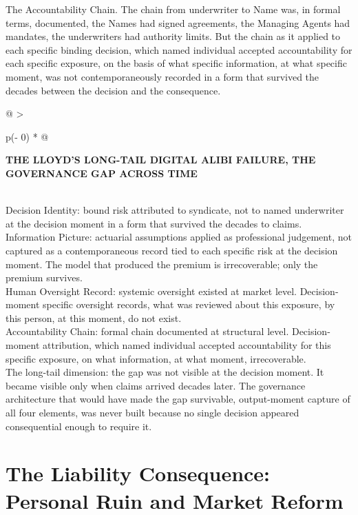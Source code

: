 The Accountability Chain. The chain from underwriter to Name was, in formal terms, documented, the Names had signed agreements, the Managing Agents had mandates, the underwriters had authority limits. But the chain as it applied to each specific binding decision, which named individual accepted accountability for each specific exposure, on the basis of what specific information, at what specific moment, was not contemporaneously recorded in a form that survived the decades between the decision and the consequence.

\begin{longtable}[]{@{}
  >{\raggedright\arraybackslash}p{(\columnwidth - 0\tabcolsep) * }@{}}
\toprule\noalign{}
\begin{minipage}[b]{\linewidth}\raggedright
\textbf{THE LLOYD'S LONG-TAIL DIGITAL ALIBI FAILURE, THE GOVERNANCE GAP ACROSS TIME}
\end{minipage} \\
\midrule\noalign{}
\endhead
\bottomrule\noalign{}
\endlastfoot
Decision Identity: bound risk attributed to syndicate, not to named underwriter at the decision moment in a form that survived the decades to claims. \\
Information Picture: actuarial assumptions applied as professional judgement, not captured as a contemporaneous record tied to each specific risk at the decision moment. The model that produced the premium is irrecoverable; only the premium survives. \\
Human Oversight Record: systemic oversight existed at market level. Decision-moment specific oversight records, what was reviewed about this exposure, by this person, at this moment, do not exist. \\
Accountability Chain: formal chain documented at structural level. Decision-moment attribution, which named individual accepted accountability for this specific exposure, on what information, at what moment, irrecoverable. \\
The long-tail dimension: the gap was not visible at the decision moment. It became visible only when claims arrived decades later. The governance architecture that would have made the gap survivable, output-moment capture of all four elements, was never built because no single decision appeared consequential enough to require it. \\
\end{longtable}

\scenebreak

\section{The Liability Consequence: Personal Ruin and Market Reform}

